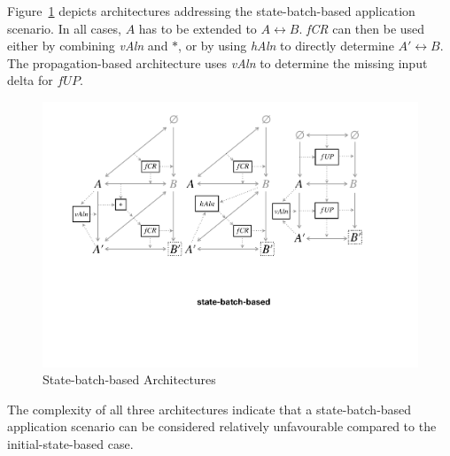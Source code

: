Figure~\ref{fig:stateBatchBased} depicts architectures addressing the state-batch-based application scenario.
In all cases, $A$ has to be extended to $A \leftrightarrow B$.
\emph{fCR} can then be used either by combining \emph{vAln} and $\ast$, or by using \emph{hAln} to directly determine $A' \leftrightarrow B$.
The propagation-based architecture uses \emph{vAln} to determine the missing input delta for $\mathit{fUP}$.
%
\begin{figure}[b!]
	\centering
	\includegraphics[width=\columnwidth]{diagrams/foundations/state-batch-based}
	\caption{State-batch-based Architectures}
	\label{fig:stateBatchBased}
\end{figure}
%
The complexity of all three architectures indicate that a state-batch-based application scenario can be considered relatively unfavourable compared to the initial-state-based case.

